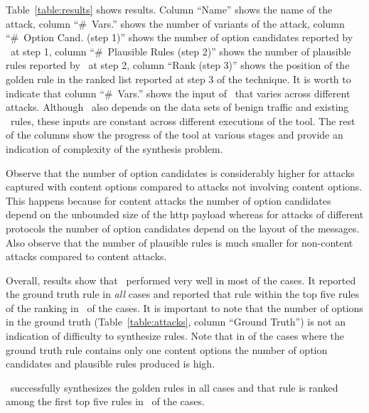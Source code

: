 \documentclass[sigconf,review, anonymous]{acmart}
\begin{document}
Table~\ref{table:results} shows results. Column ``Name'' shows the
name of the attack, column ``\#~Vars.'' shows the number of variants
of the attack, column ``\#~Option Cand. (step 1)'' shows the number of
option candidates reported by \tname\ at step 1, column ``\#~Plausible
Rules (step 2)'' shows the number of plausible rules reported by
\tname\ at step 2, column ``Rank (step 3)'' shows the position of the
golden rule in the ranked list reported at step 3 of the technique.
It is worth to indicate that column ``\#~Vars.'' shows the input of
\tname\ that varies across different attacks. Although \tname\ also
depends on the data sets of benign traffic and existing \suri\ rules,
these inputs are constant across different executions of the tool. The
rest of the columns show the progress of the tool at various stages
and provide an indication of complexity of the synthesis problem.

Observe that the number of option candidates is considerably higher
for attacks captured with content options compared to attacks not
involving content options. This happens because for content attacks
the number of option candidates depend on the unbounded size of the
http payload whereas for attacks of different protocols the number of
option candidates depend on the layout of the messages. Also observe
that the number of plausible rules is much smaller for non-content
attacks compared to content attacks.

\newcommand{\percTopFiveRanking}{\Fix{X\%}}

Overall, results show that \tname\ performed very well in most of the
cases. It reported the ground truth rule in \emph{all} cases and
reported that rule within the top five rules of the ranking in
\percTopFiveRanking\ of the cases. It is important to note that the
number of options in the ground truth (Table~\ref{table:attacks},
column ``Ground Truth'') is not an indication of difficulty to
synthesize rules. Note that in  of the cases where the
ground truth rule contains only one content options the number of
option candidates and plausible rules produced is high. 

\begin{center}
\begin{tcolorbox}[enhanced,width=3.3in,center upper,drop shadow southwest,sharp corners]
\tname\ successfully synthesizes the golden rules in all cases and
that rule is ranked among the first top five rules in
\percTopFiveRanking\ of the cases.
\end{tcolorbox}
\end{center}
\end{document}
